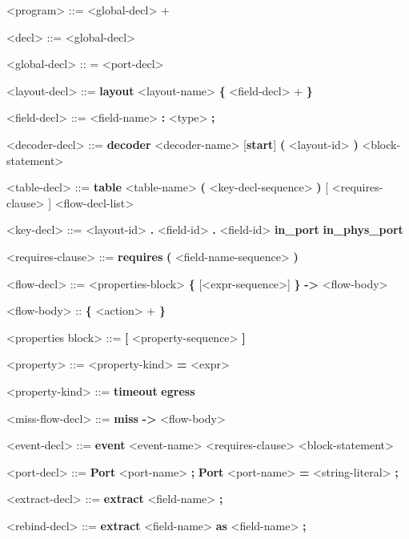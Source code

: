 \begin{mdframed}
\begin{grammar}

<program> ::= <global-decl> +

<decl> ::=
<global-decl>

<global-decl> :: =
<port-decl>

<layout-decl> ::=
\textbf{layout} <layout-name> 
\textbf{\{}
	<field-decl> +
\textbf{\}}

<field-decl> ::=
<field-name> \textbf{:} <type> \textbf{;}

<decoder-decl> ::=
\textbf{decoder} <decoder-name> [\textbf{start}] 
\textbf{(} <layout-id> \textbf{)}
<block-statement>

<table-decl> ::=
\textbf{table} <table-name> \textbf{(} <key-decl-sequence> \textbf{)} 
[ <requires-clause> ] <flow-decl-list>

<key-decl> ::=
<layout-id> \textbf{.} <field-id>
 \textbf{.} <field-id>
\alt \textbf{in\_port}
\alt \textbf{in\_phys\_port}

<requires-clause> ::=
\textbf{requires} \textbf{(} <field-name-sequence> \textbf{)}

<flow-decl> ::=
<properties-block>
\textbf{\{} [<expr-sequence>] \textbf{\}} \textbf{-\textgreater} <flow-body>

<flow-body> :: \textbf{\{} <action> + \textbf{\}}

<properties block> ::=
\textbf{[} <property-sequence> \textbf{]}

<property> ::=
<property-kind> \textbf{=} <expr>

<property-kind> ::=
\textbf{timeout}
\alt \textbf{egress}

<miss-flow-decl> ::=
\textbf{miss} \textbf{-\textgreater} <flow-body>

<event-decl> ::=
\textbf{event} <event-name> <requires-clause> 
<block-statement>

<port-decl> ::=
\textbf{Port} <port-name> \textbf{;}
\alt \textbf{Port} <port-name> \textbf{=} <string-literal> \textbf{;}

<extract-decl> ::=
\textbf{extract} <field-name> \textbf{;}

<rebind-decl> ::=
\textbf{extract} <field-name> \textbf{as} <field-name> \textbf{;}


\end{grammar}
\end{mdframed}
